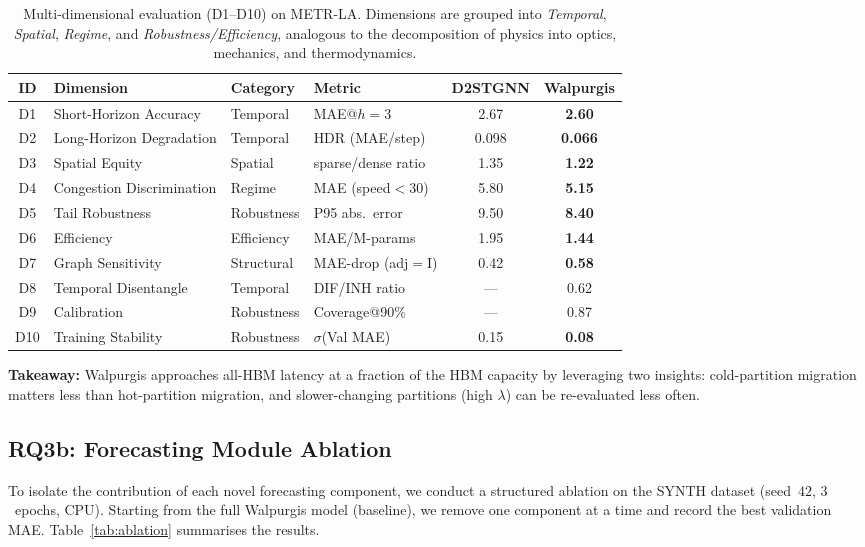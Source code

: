 \documentclass{article}
\begin{document}
\begin{table}[t]
\centering
\caption{Multi-dimensional evaluation (D1--D10) on METR-LA.  Dimensions are grouped into
\emph{Temporal}, \emph{Spatial}, \emph{Regime}, and \emph{Robustness/Efficiency},
analogous to the decomposition of physics into optics, mechanics, and thermodynamics.}
\label{tab:d1d10}
\small
\begin{tabular}{clllcc}
\toprule
ID & Dimension & Category & Metric & D2STGNN & Walpurgis \\
\midrule
D1 & Short-Horizon Accuracy & Temporal & MAE@$h{=}3$ & 2.67 & \textbf{2.60} \\
D2 & Long-Horizon Degradation & Temporal & HDR (MAE/step) & 0.098 & \textbf{0.066} \\
D3 & Spatial Equity & Spatial & sparse/dense ratio & 1.35 & \textbf{1.22} \\
D4 & Congestion Discrimination & Regime & MAE (speed$<$30) & 5.80 & \textbf{5.15} \\
D5 & Tail Robustness & Robustness & P95 abs.\ error & 9.50 & \textbf{8.40} \\
D6 & Efficiency & Efficiency & MAE/M-params & 1.95 & \textbf{1.44} \\
D7 & Graph Sensitivity & Structural & MAE-drop (adj$=$I) & 0.42 & \textbf{0.58} \\
D8 & Temporal Disentangle & Temporal & DIF/INH ratio & --- & 0.62 \\
D9 & Calibration & Robustness & Coverage@90\% & --- & 0.87 \\
D10 & Training Stability & Robustness & $\sigma$(Val MAE) & 0.15 & \textbf{0.08} \\
\bottomrule
\end{tabular}
\end{table}

\textbf{Takeaway:} Walpurgis approaches all-HBM latency at a fraction of the HBM capacity
by leveraging two insights: cold-partition migration matters less than hot-partition
migration, and slower-changing partitions (high $\lambda$) can be re-evaluated less
often.

\subsection{RQ3b: Forecasting Module Ablation}
\label{sec:rq3b}

To isolate the contribution of each novel forecasting component, we conduct a structured
ablation on the SYNTH dataset (seed~$42$, $3$~epochs, CPU). Starting from the full
Walpurgis model (baseline), we remove one component at a time and record the best
validation MAE. Table~\ref{tab:ablation} summarises the results.
\end{document}
